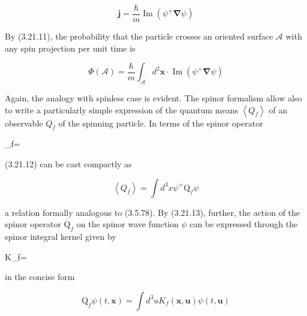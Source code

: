 \documentclass{article}
\begin{document}
\begin{equation*}
\boldsymbol{j}=\frac{\hbar}{m} \operatorname{Im}\left(\psi^{+} \boldsymbol{\nabla} \psi\right) \tag{3.21.30}
\end{equation*}
 

By (3.21.11), the probability that the particle crosses an oriented surface $\mathcal{A}$ with any spin projection per unit time is
 
\begin{equation*}
\Phi(\mathcal{A})=\frac{\hbar}{m} \int_{\mathcal{A}} d^{2} \boldsymbol{x} \cdot \operatorname{Im}\left(\psi^{+} \boldsymbol{\nabla} \psi\right) \tag{3.21.31}
\end{equation*}
 

Again, the analogy with spinless case is evident.
The spinor formalism allow also to write a particularly simple expression of the quantum means $\left\langle Q_{f}\right\rangle$ of an observable $Q_{f}$ of the spinning particle. In terms of the spinor operator
 
_{f}=
 
(3.21.12) can be cast compactly as
 
\begin{equation*}
\left\langle Q_{f}\right\rangle=\int d^{3} x \psi^{+} \mathrm{Q}_{f} \psi \tag{3.21.33}
\end{equation*}
 
a relation formally analogous to (3.5.78). By (3.21.13), further, the action of the spinor operator $\mathrm{Q}_{f}$ on the spinor wave function $\psi$ can be expressed through the spinor integral kernel given by
 
K_{f}=
 
in the concise form
 
\begin{equation*}
\mathrm{Q}_{f} \psi(t, \boldsymbol{x})=\int d^{3} u K_{f}(\boldsymbol{x}, \boldsymbol{u}) \psi(t, \boldsymbol{u}) \tag{3.21.35}
\end{equation*}
 
\end{document}
